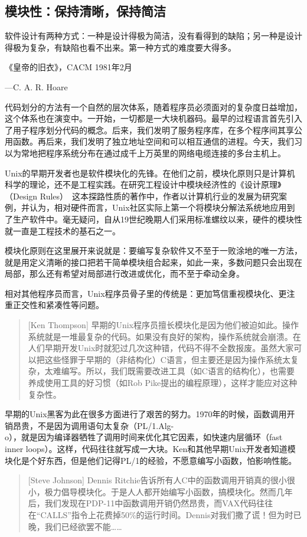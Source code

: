 \documentclass[12pt,oneside]{ctexbook}
\begin{document}
\begin{common-format}
\chapter{模块性：保持清晰，保持简洁}
\begin{flushright}
\begin{notecard}{30em}
软件设计有两种方式：一种是设计得极为简洁，没有看得到的缺陷；另一种是设计得极为复杂，有缺陷也看不出来。第一种方式的难度要大得多。

{\hfill 《皇帝的旧衣》，CACM 1981年2月}

{\hfill —C. A. R. Hoare}
\end{notecard}
\end{flushright}

代码划分的方法有一个自然的层次体系，随着程序员必须面对的复杂度日益增加，这个体系也在演变中。一开始，一切都是一大块机器码。最早的过程语言首先引入了用子程序划分代码的概念。后来，我们发明了服务程序库，在多个程序间其享公用函数。再后来，我们发明了独立地址空间和可以相互通信的进程。今天，我们习以为常地把程序系统分布在通过成千上万英里的网络电缆连接的多台主机上。

Unix的早期开发者也是软件模块化的先锋。在他们之前，模块化原则只是计算机科学的理论，还不是工程实践。在研究工程设计中模块经济性的《设计原理》（Design Rules）~\cite{Baldwin-Clark}这本探路性质的著作中，作者以计算机行业的发展为研究案例，并认为，相对硬件而言，Unix社区实际上第一个将模块分解法系统地应用到了生产软件中。毫无疑问，自从19世纪晚期人们采用标准螺纹以来，硬件的模块性就一直是工程技术的基石之一。

模块化原则在这里展开来说就是：要编写复杂软件又不至于一败涂地的唯一方法，就是用定义清晰的接口把若干简单模块组合起来，如此一来，多数问题只会出现在局部，那么还有希望对局部进行改进或优化，而不至于牵动全身。

相对其他程序员而言，Unix程序员骨子里的传统是：更加笃信重视模块化、更注重正交性和紧凑性等问题。
\begin{quote}[Ken Thompson]
早期的Unix程序员擅长模块化是因为他们被迫如此。操作系统就是一堆最复杂的代码。如果没有良好的架构，操作系统就会崩溃。在人们早期开发Unix时就犯过几次这种错，代码不得不全数报废。虽然大家可以把这些怪罪于早期的（非结构化）C语言，但主要还是因为操作系统太复杂，太难编写。所以，我们既需要改进工具（如C语言的结构化），也需要养成使用工具的好习惯（如Rob Pike提出的编程原理），这样才能应对这种复杂性。
\end{quote}

早期的Unix黑客为此在很多方面进行了艰苦的努力。1970年的时候，函数调用开销昂贵，不是因为调用语句太复杂（PL/1.Alg-\\o），就是因为编译器牺牲了调用时间来优化其它因素，如快速内层循环（fast inner loops）。这样，代码往往就写成一大块。Ken和其他早期Unix开发者知道模块化是个好东西，但是他们记得PL/1的经验，不愿意编写小函数，怕影响性能。
\begin{quote}[Steve Johnson]
Dennis Ritchie告诉所有人C中的函数调用开销真的很小很小，极力倡导模块化。于是人人都开始编写小函数，搞模块化。然而几年后，我们发现在PDP-11中函数调用开销仍然昂贵，而VAX代码往往在“CALLS”指令上花费掉50\%的运行时间。Dennis对我们撒了谎！但为时已晚，我们已经欲罢不能……
\end{quote}


\end{common-format}
\end{document}

